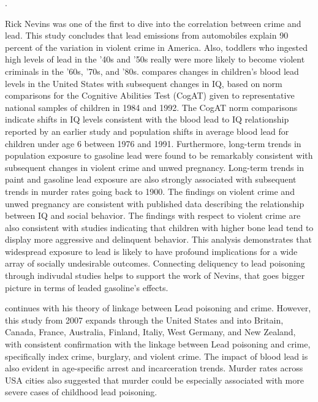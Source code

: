 \documentclass{article}
\begin{document}
\noindent {}.

\medskip

Rick Nevins was one of the first to dive into the correlation between crime and lead. This study concludes that lead emissions from automobiles explain 90 percent of the variation in violent crime in America. Also, toddlers who ingested high levels of lead in the '40s and '50s really were more likely to become violent criminals in the '60s, '70s, and '80s. \cite{nevin_2000} compares changes in children’s blood lead levels in the United States with subsequent changes in IQ, based on norm comparisons for the Cognitive Abilities Test (CogAT) given to representative national samples of children in 1984 and 1992. The CogAT norm comparisons indicate shifts in IQ levels consistent with the blood lead to IQ relationship reported by an earlier study and population shifts in average blood lead for children under age 6 between 1976 and 1991. Furthermore, long-term trends in population exposure to gasoline lead were found to be remarkably consistent with subsequent changes in violent crime and unwed pregnancy. Long-term trends in paint and gasoline lead exposure are also strongly associated with subsequent trends in murder rates going back to 1900. The findings on violent crime and unwed pregnancy are consistent with published data describing the relationship between IQ and social behavior. The findings with respect to violent crime are also consistent with studies indicating that children with higher bone lead tend to display more aggressive and delinquent behavior. This analysis demonstrates that widespread exposure to lead is likely to have profound implications for a wide array of socially undesirable outcomes. Connecting deliquency to lead poisoning through indivudal studies helps to support the work of Nevins, that goes bigger picture in terms of leaded gasoline's effects. 

\medskip

\noindent {}

\medskip

\cite{nevin_2007} continues with his theory of linkage between Lead poisoning and crime. However, this study from 2007 expands through the United States and into Britain, Canada, France, Australia, Finland, Italiy, West Germany, and New Zealand, with consistent confirmation with the linkage between Lead poisoning and crime, specifically index crime, burglary, and violent crime. The impact of blood lead is also evident in age-specific arrest and incarceration trends. Murder rates across USA cities also suggested that murder could be especially associated with more severe cases of childhood lead poisoning.
\end{document}
